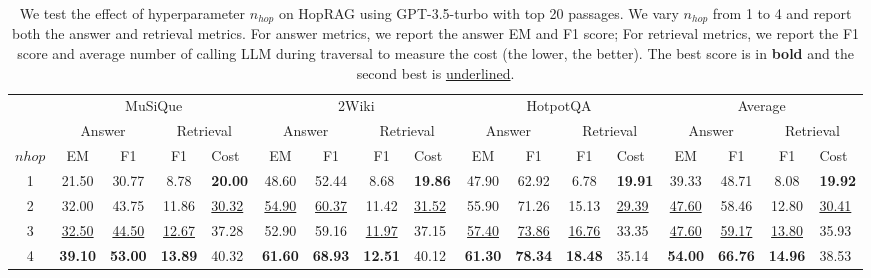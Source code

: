 \begin{table}[htb]
\setlength{\tabcolsep}{3pt}
\small
\centering
      \begin{tabular}{cccclccclccclcccl}
    \toprule
 & \multicolumn{4}{c}{MuSiQue}& \multicolumn{4}{c}{2Wiki}& \multicolumn{4}{c}{HotpotQA}& \multicolumn{4}{c}{Average}\\
 & \multicolumn{2}{c}{Answer}&\multicolumn{2}{c}{Retrieval}& \multicolumn{2}{c}{Answer}&\multicolumn{2}{c}{Retrieval}& \multicolumn{2}{c}{Answer}&\multicolumn{2}{c}{Retrieval}& \multicolumn{2}{c}{Answer}&\multicolumn{2}{c}{Retrieval}\\
        
        $n{hop}$& EM& F1 & F1  &Cost& EM& F1 & F1 
 &Cost& EM& F1 &F1 
  &Cost& EM& F1 &F1 
 &Cost\\
        \midrule
        1& 21.50 & 30.77 & 8.78 &\textbf{20.00}& 48.60 & 52.44 & 8.68 &\textbf{19.86}& 47.90& 62.92 &6.78 &\textbf{19.91}&  39.33& 48.71 &8.08 &\textbf{19.92}\\
        2& 
32.00 & 43.75 & 11.86 &\underline{30.32}& \underline{54.90}& \underline{60.37}& 11.42 &\underline{31.52}& 55.90 & 71.26 &15.13 &\underline{29.39}& \underline{47.60}& 58.46 &12.80 &\underline{30.41}\\
 3& 
\underline{32.50}& \underline{44.50}& \underline{12.67}&37.28 & 52.90& 59.16& \underline{11.97}&37.15 & \underline{57.40}& \underline{73.86}&\underline{16.76}&33.35 & \underline{47.60}& \underline{59.17}&\underline{13.80}&35.93 \\ 
        4&    \textbf{39.10}&  \textbf{53.00}&  \textbf{13.89}&40.32& \textbf{61.60}& \textbf{68.93}& \textbf{12.51}&40.12& \textbf{61.30}& \textbf{78.34}&\textbf{18.48}&35.14& \textbf{54.00}& \textbf{66.76}&\textbf{14.96}&38.53 \\
        \bottomrule
    \end{tabular}
    \caption{    
   We test the effect of hyperparameter $n_{hop}$ on HopRAG using GPT-3.5-turbo
with top 20 passages. We vary $n_{hop}$ from 1 to 4 and report both the answer and retrieval metrics. For answer metrics, we report the answer EM and F1 score; For retrieval metrics, we report the F1 score and average number of calling
LLM during traversal to measure the cost (the lower, the better). The best score is in \textbf{bold} and the second best is
\underline{underlined}. 
    }
    \label{tab:nhopall}
\end{table}

